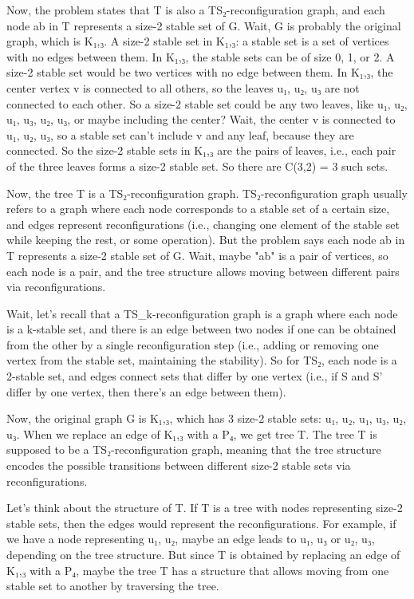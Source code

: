 Now, the problem states that T is also a TS₂-reconfiguration graph, and each node ab in T represents a size-2 stable set of G. Wait, G is probably the original graph, which is K₁,₃. A size-2 stable set in K₁,₃: a stable set is a set of vertices with no edges between them. In K₁,₃, the stable sets can be of size 0, 1, or 2. A size-2 stable set would be two vertices with no edge between them. In K₁,₃, the center vertex v is connected to all others, so the leaves u₁, u₂, u₃ are not connected to each other. So a size-2 stable set could be any two leaves, like {u₁, u₂}, {u₁, u₃}, {u₂, u₃}, or maybe including the center? Wait, the center v is connected to u₁, u₂, u₃, so a stable set can't include v and any leaf, because they are connected. So the size-2 stable sets in K₁,₃ are the pairs of leaves, i.e., each pair of the three leaves forms a size-2 stable set. So there are C(3,2) = 3 such sets.

Now, the tree T is a TS₂-reconfiguration graph. TS₂-reconfiguration graph usually refers to a graph where each node corresponds to a stable set of a certain size, and edges represent reconfigurations (i.e., changing one element of the stable set while keeping the rest, or some operation). But the problem says each node ab in T represents a size-2 stable set of G. Wait, maybe "ab" is a pair of vertices, so each node is a pair, and the tree structure allows moving between different pairs via reconfigurations.

Wait, let's recall that a TS_k-reconfiguration graph is a graph where each node is a k-stable set, and there is an edge between two nodes if one can be obtained from the other by a single reconfiguration step (i.e., adding or removing one vertex from the stable set, maintaining the stability). So for TS₂, each node is a 2-stable set, and edges connect sets that differ by one vertex (i.e., if S and S' differ by one vertex, then there's an edge between them).

Now, the original graph G is K₁,₃, which has 3 size-2 stable sets: {u₁, u₂}, {u₁, u₃}, {u₂, u₃}. When we replace an edge of K₁,₃ with a P₄, we get tree T. The tree T is supposed to be a TS₂-reconfiguration graph, meaning that the tree structure encodes the possible transitions between different size-2 stable sets via reconfigurations.

Let's think about the structure of T. If T is a tree with nodes representing size-2 stable sets, then the edges would represent the reconfigurations. For example, if we have a node representing {u₁, u₂}, maybe an edge leads to {u₁, u₃} or {u₂, u₃}, depending on the tree structure. But since T is obtained by replacing an edge of K₁,₃ with a P₄, maybe the tree T has a structure that allows moving from one stable set to another by traversing the tree.

